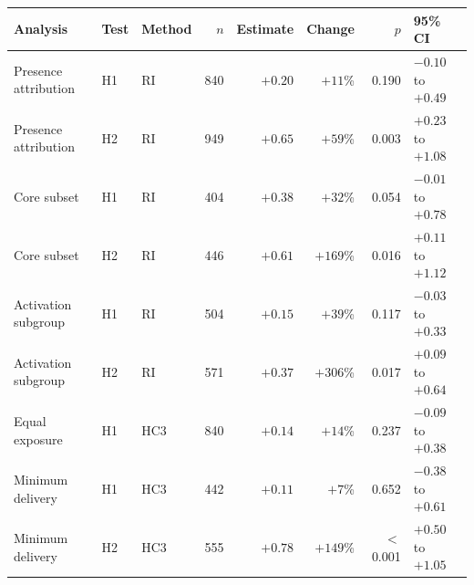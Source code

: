 \begin{tabular}{lllrrrrl}
\toprule
Analysis & Test & Method & $n$ & Estimate & Change & $p$ & 95\% CI \\
\midrule
Presence attribution & H1 & RI & 840 & $+0.20$ & $+11$\% & 0.190 & $-0.10$ to $+0.49$ \\
Presence attribution & H2 & RI & 949 & $+0.65$ & $+59$\% & 0.003 & $+0.23$ to $+1.08$ \\
Core subset & H1 & RI & 404 & $+0.38$ & $+32$\% & 0.054 & $-0.01$ to $+0.78$ \\
Core subset & H2 & RI & 446 & $+0.61$ & $+169$\% & 0.016 & $+0.11$ to $+1.12$ \\
Activation subgroup & H1 & RI & 504 & $+0.15$ & $+39$\% & 0.117 & $-0.03$ to $+0.33$ \\
Activation subgroup & H2 & RI & 571 & $+0.37$ & $+306$\% & 0.017 & $+0.09$ to $+0.64$ \\
Equal exposure & H1 & HC3 & 840 & $+0.14$ & $+14$\% & 0.237 & $-0.09$ to $+0.38$ \\
Minimum delivery & H1 & HC3 & 442 & $+0.11$ & $+7$\% & 0.652 & $-0.38$ to $+0.61$ \\
Minimum delivery & H2 & HC3 & 555 & $+0.78$ & $+149$\% & $<$0.001 & $+0.50$ to $+1.05$ \\
\bottomrule
\end{tabular}

